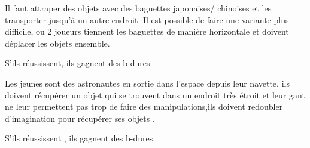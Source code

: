 \documentclass{grand-jeu}
\begin{document}
\begin{liste-materiel}

\end{liste-materiel}

\begin{regles}
Il faut attraper des objets avec des baguettes japonaises/ chinoises et les transporter jusqu’à un autre endroit. Il est possible de faire une variante plus difficile, ou 2 joueurs tiennent les baguettes de manière horizontale et doivent déplacer les objets ensemble.

 S’ils réussissent, ils gagnent des b-dures.
\end{regles}

\begin{imaginaire}
Les jeunes sont des astronautes en sortie dans l’espace depuis leur navette, ils doivent récupérer un objet qui se trouvent dans un endroit très étroit et leur gant ne leur permettent pas trop de faire des manipulations,ils doivent redoubler d'imagination pour récupérer ses objets .

S'ils réussissent , ils gagnent des b-dures.

\end{imaginaire}



\begin{moments-stop}
\end{moments-stop}
\end{document}
